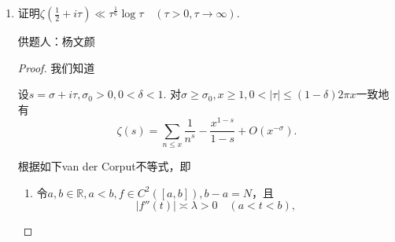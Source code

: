 \documentclass[lang=cn,12pt,a4paper]{elegantpaper}
\begin{document}
\begin{enumerate}
\begin{proof}
\begin{enumerate}
\begin{enumerate}[i]
					利用(i), 将三者展开, 有
					\[\left\{
						\begin{aligned}
							-(\Delta a)_1&=\sum_{i=0}^{n}(-1)^{i+1}\binom{n}{i}(\Delta ^{i+1}a)_{n+1-i},\\
							(\Delta^2 a)_0 &=\sum_{i=0}^{n}(-1)^{i+2}\binom{n}{i}(\Delta ^{i+2}a)_{n-i},\\
							a_2&=\sum_{i=0}^{n}(-1)^{i}\binom{n}{i}(\Delta ^{i}a)_{n+2-i},\\
						\end{aligned}\right.
					\]
					我们证明存在$n$, $u(\Delta^2 a)_0+\alpha(\Delta a)_1+va_2$的$(-1)^{i+1}(\Delta^{i+i}a)_{n+1-i}$前系数大于$0$, 即\[u\binom{n}{i-1}+v\binom{n}{i+1}>\alpha\binom{n}{i},\]进一步化简, 即\[\alpha+u+v<(n+1)\left(\frac{u}{n-i+1}+\frac{v}{i+1}\right),\]由Cauchy不等式, 只需保证$\alpha+u+v<\dfrac{(n+1)(\sqrt{u}+\sqrt{v})^2}{n+2}$, 取\[n=\left[\frac{(\sqrt{u}+\sqrt{v})^2}{1-\alpha}\right]+1\]即可. 取这个$n$, 即有\[u(\Delta^2 a)_0+\alpha(\Delta a)_1+va_2=\sum \ast\cdot (-1)^{i+1}(\Delta^{i+1}a)_{n+1-i}\geq 0,\]这里的$\ast$为某个正数. 再令$\alpha\to 1$, 知$u(\Delta^2 a)_0+(\Delta a)_1+va_2\geq0$.

				\item 在(ii)中取$u(\Delta^2 a)_0=va_2$, 有$-\Delta a_1=a_1-a_2\leq \sqrt{a_2(a_0-2a_1+a_2)}$, 两边平方即有$a_0 a_2\geq a_1^2$, 对于一般的$n=n_0$, 由数列$\{a_{n+n_0}\}$也是完全单调的, 故$a_{n_0}a_{n_0+2}\geq a_{n_0+1}^2$.
			\end{enumerate}
		\end{enumerate}
		
	\end{proof}
	
	
	\item 证明$\zeta(\frac{1}{2}+i \tau) \ll \tau^{\frac{1}{6}}\log \tau \quad (\tau>0, \tau \to \infty).$ 
		\begin{flushright}
			\kaishu
			供题人：杨文颜
		\end{flushright}
		
	\begin{proof}
		我们知道
		\begin{lemma}
			设$s=\sigma +i \tau, \sigma_0 > 0, 0 < \delta < 1$. 对$\sigma \geq \sigma_0, x \geq 1, 0 < |\tau| \leq (1-\delta) 2\pi x$一致地有
			\[ \zeta(s)=\sum_{n \leq x} \frac{1}{n^s} - \frac{x^{1-s}}{1-s} + O(x^{-\sigma}). \]
		\end{lemma}

		根据如下van der Corput不等式，即
		\begin{lemma}
			\begin{enumerate}
				\item
				令$a,b \in \mathbb{R}, a<b, f \in C^{2}([a,b]), b-a=N$，且
				\[ |f''(t)| \asymp \lambda >0 \quad (a<t<b),\]


\end{enumerate}
\end{lemma}
\end{proof}
\end{enumerate}
\end{document}
